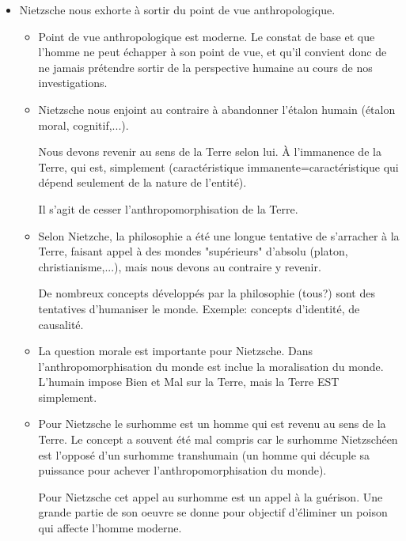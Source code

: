\documentclass{report}
\theoremstyle{definition}
\begin{document}
\begin{itemize}
    \item Nietzsche nous exhorte à sortir du point de vue anthropologique.
    \begin{itemize}
        \item Point de vue anthropologique est moderne. Le constat de base et que l'homme ne peut échapper à son point de vue, et qu'il convient donc de ne jamais prétendre sortir de la perspective humaine au cours de nos investigations.
        \item Nietzsche nous enjoint au contraire à abandonner l'étalon humain (étalon moral, cognitif,...).

        Nous devons revenir au sens de la Terre selon lui. À l'immanence de la Terre, qui est, simplement (caractéristique immanente=caractéristique qui dépend seulement de la nature de l'entité).

        Il s'agit de cesser l'anthropomorphisation de la Terre.

        \item Selon Nietzche, la philosophie a été une longue tentative de s'arracher à la Terre, faisant appel à des mondes "supérieurs" d'absolu (platon, christianisme,...), mais nous devons au contraire y revenir.

        De nombreux concepts développés par la philosophie (tous?) sont des tentatives d'humaniser le monde. Exemple: concepts d'identité, de causalité.

        \item La question morale est importante pour Nietzsche. Dans l'anthropomorphisation du monde est inclue la moralisation du monde. L'humain impose Bien et Mal sur la Terre, mais la Terre EST simplement.
        \item Pour Nietzsche le surhomme est un homme qui est revenu au sens de la Terre. Le concept a souvent été mal compris car le surhomme Nietzschéen est l'opposé d'un surhomme transhumain (un homme qui décuple sa puissance pour achever l'anthropomorphisation du monde).

        Pour Nietzsche cet appel au surhomme est un appel à la guérison. Une grande partie de son oeuvre se donne pour objectif d'éliminer un poison qui affecte l'homme moderne.
    \end{itemize}
\end{itemize}
\end{document}
